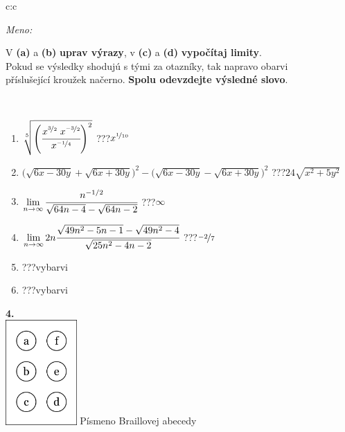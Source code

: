 \documentclass[10pt]{report}
\begin{document}
\begin{tabular}{c:c}
\begin{minipage}[c][104.5mm][t]{0.5\linewidth}
\begin{center}
\textit{Meno:}\phantom{xxxxxxxxxxxxxxxxxxxxxxxxxxxxxxxxxxxxxxxxxxxxxxxxxxxxxxxxxxxxxxxxx}\\[5mm]
\begin{minipage}{0.95\linewidth}
\begin{center}
V \textbf{(a)} a \textbf{(b)} \textbf{uprav výrazy}, v \textbf{(c)} a \textbf{(d)} \textbf{vypočítaj limity}.\\Pokud se výsledky shodujú s tými za otazníky, tak napravo obarvi\\příslušející kroužek načerno. \textbf{Spolu odevzdejte výsledné slovo}.
\end{center}
\end{minipage}
\\[1mm]
\begin{minipage}{0.79\linewidth}
\begin{center}
\begin{varwidth}{\linewidth}
\begin{enumerate}
\small
\item $\sqrt[5]{\left(\cfrac{x^{\nicefrac{3}{2}}\;x^{\nicefrac{-3}{2}}}{x^{\nicefrac{-1}{4}}}\right)^{2}}$\quad \dotfill\; ???\;\dotfill \quad $x^{\nicefrac{1}{10}}$
\item {\footnotesize{\scriptsize$\big(\sqrt{6x-30y}+\sqrt{6x+30y}\big)^2-\big(\sqrt{6x-30y}-\sqrt{6x+30y}\big)^2$}\quad \dotfill\; ???\;\dotfill \quad $24\sqrt{x^2+5y^2}$}
\item $\lim\limits_{n\to\infty}\cfrac{n^{-1/2}}{\sqrt{64n-4}-\sqrt{64n-2}}$\quad \dotfill\; ???\;\dotfill \quad $\infty$
\item $\lim\limits_{n\to\infty}2n\cfrac{\sqrt{49n^2-5n-1}-\sqrt{49n^2-4}}{\sqrt{25n^2-4n-2}}$\quad \dotfill\; ???\;\dotfill \quad $\nicefrac{-2}{7}$
\item \quad \dotfill\; ???\;\dotfill \quad vybarvi
\item \quad \dotfill\; ???\;\dotfill \quad vybarvi
\end{enumerate}
\end{varwidth}
\end{center}
\end{minipage}
\begin{minipage}{0.20\linewidth}
\begin{center}
{\Huge\bfseries 4.} \\[2mm]
\includegraphics[height=40mm]{../images/braille.png}
{\small Písmeno Braillovej abecedy}
\end{center}
\end{minipage}
\end{center}
\end{minipage}
%
\end{tabular}
\end{document}

